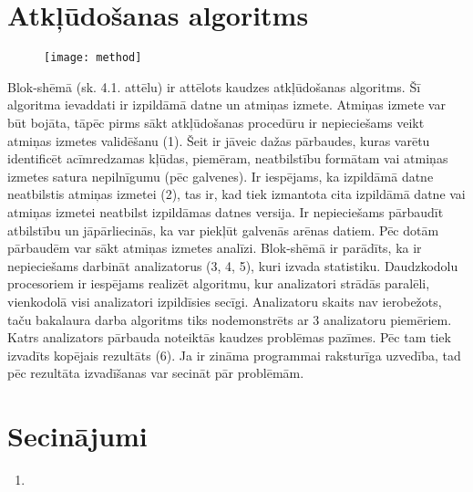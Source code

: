 ﻿\section{Atkļūdošanas algoritms}

 \begin{figure}[h]
\begin{center}
\texttt{[image: method]}
\end{center}
\caption{\textbf{\fontsize{11}{12}\selectfont {Uz metodi balstītā algoritma blok-shēma}}}
\end{figure}

Blok-shēmā (sk. 4.1. attēlu) ir attēlots kaudzes atkļūdošanas algoritms.
Šī algoritma ievaddati ir izpildāmā datne un atmiņas izmete.
Atmiņas izmete var būt bojāta, tāpēc pirms sākt atkļūdošanas procedūru ir nepieciešams veikt atmiņas izmetes validēšanu (1).
Šeit ir jāveic dažas pārbaudes, kuras varētu identificēt acīmredzamas kļūdas, piemēram, neatbilstību formātam vai atmiņas izmetes satura nepilnīgumu (pēc galvenes).
Ir iespējams, ka izpildāmā datne neatbilstis atmiņas izmetei (2), tas ir, kad tiek izmantota cita izpildāmā datne vai atmiņas izmetei neatbilst izpildāmas datnes versija.
Ir nepieciešams pārbaudīt atbilstību un jāpārliecinās, ka var piekļūt galvenās arēnas datiem.
Pēc dotām pārbaudēm var sākt atmiņas izmetes analīzi.
Blok-shēmā ir parādīts, ka ir nepieciešams darbināt analizatorus (3, 4, 5), kuri  izvada statistiku.
Daudzkodolu procesoriem ir iespējams realizēt algoritmu, kur analizatori strādās paralēli, vienkodolā visi analizatori izpildīsies secīgi. 
Analizatoru skaits nav ierobežots, taču bakalaura darba algoritms tiks nodemonstrēts ar 3 analizatoru piemēriem. 
Katrs analizators pārbauda noteiktās kaudzes problēmas pazīmes. 
Pēc tam tiek izvadīts kopējais rezultāts (6).
Ja ir zināma programmai raksturīga uzvedība, tad pēc rezultāta izvadīšanas var secināt pār problēmām.











\section{Secinājumi}
\begin{enumerate}
\item 
\end{enumerate}



